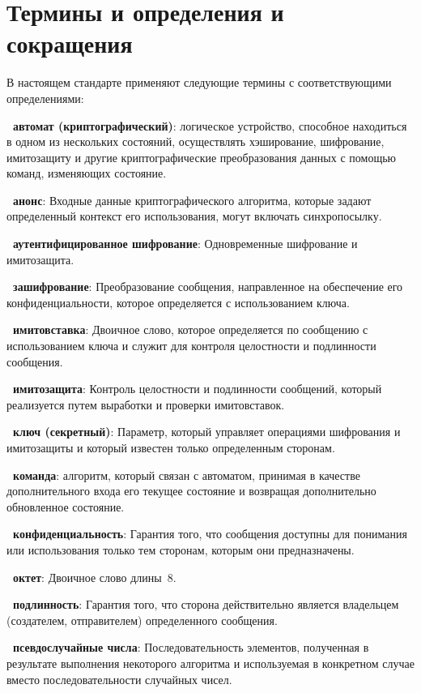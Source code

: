 \chapter{Термины и определения и сокращения}

В настоящем стандарте применяют
следующие термины с соответствующими определениями:

{\bf \thedefctr~автомат (криптографический)}:
логическое устройство, способное находиться в одном из нескольких 
состояний, осуществлять хэширование, шифрование, имитозащиту и другие 
криптографические преобразования данных с помощью команд, изменяющих 
состояние.

{\bf \thedefctr~анонс}:
Входные данные криптографического алгоритма,
которые задают определенный контекст его использования,
могут включать синхропосылку.

{\bf \thedefctr~аутентифицированное шифрование}:
Одновременные шифрование и имитозащита.

{\bf \thedefctr~зашифрование}:
Преобразование сообщения,
направленное на обеспечение его конфиденциальности,
которое определяется с использованием ключа.

{\bf \thedefctr~имитовставка}:
Двоичное слово, 
которое определяется по сообщению с использованием ключа 
и служит для контроля целостности и подлинности сообщения.

{\bf \thedefctr~имитозащита}:
Контроль целостности и подлинности сообщений, 
который реализуется путем выработки и проверки имитовставок.

{\bf \thedefctr~ключ (секретный)}:
Параметр, который управляет операциями шифрования 
и имитозащиты и который известен только определенным сторонам.

{\bf \thedefctr~команда}:
алгоритм, который связан с автоматом, принимая 
в качестве дополнительного входа его текущее состояние
и возвращая дополнительно обновленное состояние.

{\bf \thedefctr~конфиденциальность}:
Гарантия того, что сообщения доступны для понимания или использования
только тем сторонам, которым они предназначены.

{\bf \thedefctr~октет}:
Двоичное слово длины~$8$.

{\bf \thedefctr~подлинность}:
Гарантия того, что сторона действительно является
владельцем (создателем, отправителем) определенного сообщения.

{\bf \thedefctr~псевдослучайные числа}: 
Последовательность элементов, полученная в результате выполнения некоторого
алгоритма и используемая в конкретном случае вместо последовательности случайных
чисел.

